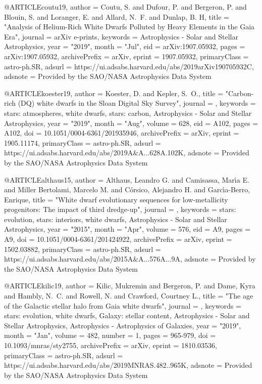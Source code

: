 \documentclass[a4paper,fleqn,usenatbib]{mnras}
\begin{document}
@ARTICLE{coutu19,
       author = {{Coutu}, S. and {Dufour}, P. and {Bergeron}, P. and {Blouin}, S. and
         {Loranger}, E. and {Allard}, N.~F. and {Dunlap}, B. H},
        title = "{Analysis of Helium-Rich White Dwarfs Polluted by Heavy Elements in the Gaia Era}",
      journal = {arXiv e-prints},
     keywords = {Astrophysics - Solar and Stellar Astrophysics},
         year = "2019",
        month = "Jul",
          eid = {arXiv:1907.05932},
        pages = {arXiv:1907.05932},
archivePrefix = {arXiv},
       eprint = {1907.05932},
 primaryClass = {astro-ph.SR},
       adsurl = {https://ui.adsabs.harvard.edu/abs/2019arXiv190705932C},
      adsnote = {Provided by the SAO/NASA Astrophysics Data System}
}

@ARTICLE{koester19,
       author = {{Koester}, D. and {Kepler}, S.~O.},
        title = "{Carbon-rich (DQ) white dwarfs in the Sloan Digital Sky Survey}",
      journal = {\aap},
     keywords = {stars: atmospheres, white dwarfs, stars: carbon, Astrophysics - Solar and Stellar Astrophysics},
         year = "2019",
        month = "Aug",
       volume = {628},
          eid = {A102},
        pages = {A102},
          doi = {10.1051/0004-6361/201935946},
archivePrefix = {arXiv},
       eprint = {1905.11174},
 primaryClass = {astro-ph.SR},
       adsurl = {https://ui.adsabs.harvard.edu/abs/2019A&A...628A.102K},
      adsnote = {Provided by the SAO/NASA Astrophysics Data System}
}


@ARTICLE{althaus15,
       author = {{Althaus}, Leandro G. and {Camisassa}, Mar{\'\i}a E. and
         {Miller Bertolami}, Marcelo M. and {C{\'o}rsico}, Alejandro H. and
         {Garc{\'\i}a-Berro}, Enrique},
        title = "{White dwarf evolutionary sequences for low-metallicity progenitors: The impact of third dredge-up}",
      journal = {\aap},
     keywords = {stars: evolution, stars: interiors, white dwarfs, Astrophysics - Solar and Stellar Astrophysics},
         year = "2015",
        month = "Apr",
       volume = {576},
          eid = {A9},
        pages = {A9},
          doi = {10.1051/0004-6361/201424922},
archivePrefix = {arXiv},
       eprint = {1502.03882},
 primaryClass = {astro-ph.SR},
       adsurl = {https://ui.adsabs.harvard.edu/abs/2015A&A...576A...9A},
      adsnote = {Provided by the SAO/NASA Astrophysics Data System}
}



@ARTICLE{kilic19,
       author = {{Kilic}, Mukremin and {Bergeron}, P. and {Dame}, Kyra and
         {Hambly}, N.~C. and {Rowell}, N. and {Crawford}, Courtney L.},
        title = "{The age of the Galactic stellar halo from Gaia white dwarfs}",
      journal = {\mnras},
     keywords = {stars: evolution, white dwarfs, Galaxy: stellar content, Astrophysics - Solar and Stellar Astrophysics, Astrophysics - Astrophysics of Galaxies},
         year = "2019",
        month = "Jan",
       volume = {482},
       number = {1},
        pages = {965-979},
          doi = {10.1093/mnras/sty2755},
archivePrefix = {arXiv},
       eprint = {1810.03536},
 primaryClass = {astro-ph.SR},
       adsurl = {https://ui.adsabs.harvard.edu/abs/2019MNRAS.482..965K},
      adsnote = {Provided by the SAO/NASA Astrophysics Data System}
}
\end{document}
